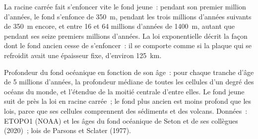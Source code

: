 La racine carrée fait s'enfoncer vite le fond jeune~: pendant son premier
million d'années, le fond s'enfonce de \qty{350}{m}, pendant les trois
millions d'années suivants de \qty{350}{m} encore, et entre 16 et
64 millions d'années de \qty{1400}{m}, autant que pendant ses seize premiers
millions d'années. La loi exponentielle décrit la façon dont le fond ancien
cesse de s'enfoncer~: il se comporte comme si la plaque qui se refroidit
avait une épaisseur fixe, d'environ \qty{125}{km}.

\begin{omfigure}

{\small Profondeur du fond océanique en fonction de son âge~: pour chaque
tranche d'âge de 5 millions d'années, la profondeur médiane de toutes les
cellules d'un degré des océans du monde, et l'étendue de la moitié centrale
d'entre elles. Le fond jeune suit de près la loi en racine carrée~; le fond
plus ancien est moins profond que les lois, parce que ses cellules
comprennent des sédiments et des volcans. Données~: ETOPO1 (NOAA) et les
âges du fond océanique de Seton et de ses collègues (2020)~; lois de
Parsons et Sclater (1977).}
\end{omfigure}

